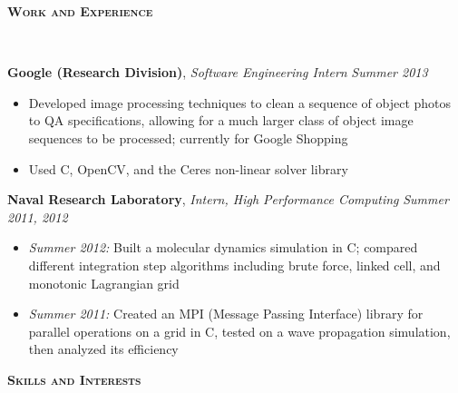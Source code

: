 \documentclass{article}
\newenvironment{changemargin}[2]{%
  \begin{list}{}{%
    \setlength{\topsep}{0pt}%
    \setlength{\leftmargin}{#1}%
    \setlength{\rightmargin}{#2}%
    \setlength{\listparindent}{\parindent}%
    \setlength{\itemindent}{\parindent}%
    \setlength{\parsep}{\parskip}%
  }%
  \item[]}{\end{list}
}
\newcommand{\lineover}{
	\begin{changemargin}{-0.05in}{-0.05in}
		\vspace*{-8pt}
		\hrulefill \\
		\vspace*{-2pt}
	\end{changemargin}
}
\newcommand{\header}[1]{
	\begin{changemargin}{-0.5in}{-0.5in}
		{\large \textbf{\scshape{#1}}}\\
  	\lineover
	\end{changemargin}
}
\newenvironment{body} {
	\vspace*{-16pt}
	\begin{changemargin}{-0.25in}{-0.5in}
  }	
	{\end{changemargin}
}
\newcommand{\CC}{C\nolinebreak\hspace{-.05em}\raisebox{.4ex}{\tiny\bf +}\nolinebreak\hspace{-.10em}\raisebox{.4ex}{\tiny\bf +}}
\begin{document}
\smallskip


\header{Work and Experience}

\begin{body}
	\vspace{14pt}
	\textbf{Google (Research Division)}, \emph{Software Engineering Intern} \hfill \emph{Summer 2013}\\
	\vspace*{-4pt}
	\begin{itemize}
		\item Developed image processing techniques to clean a sequence of object photos to QA specifications, allowing for a much larger class of object image sequences to be processed; currently for Google Shopping
		\item Used \CC, OpenCV, and the Ceres non-linear solver library
	\end{itemize}

	\medskip

	\textbf{Naval Research Laboratory}, \emph{Intern, High Performance Computing} \hfill \emph{Summer 2011, 2012}\\
	\vspace*{-4pt}
	\begin{itemize}
		\item \emph{Summer 2012:} Built a molecular dynamics simulation in C; compared different integration step algorithms including brute force, linked cell, and monotonic Lagrangian grid
		\item \emph{Summer 2011:} Created an MPI (Message Passing Interface) library for parallel operations on a grid in \CC, tested on a wave propagation simulation, then analyzed its efficiency
	\end{itemize}
\end{body}

\smallskip


\header{Skills and Interests}
\end{document}
